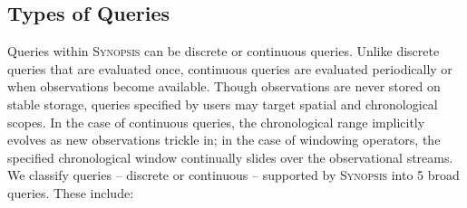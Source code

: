 \subsection{Types of Queries}
Queries within \textsc{Synopsis} can be discrete or continuous queries. Unlike discrete queries that are evaluated once, continuous queries are evaluated periodically or when observations become available. Though observations are never stored on stable storage, queries specified by users may target spatial and chronological scopes. In the case of continuous queries, the chronological range implicitly evolves as new observations trickle in; in the case of windowing operators, the specified chronological window continually slides over the observational streams. We classify queries – discrete or continuous –   supported by \textsc{Synopsis} into 5 broad queries. These include:
